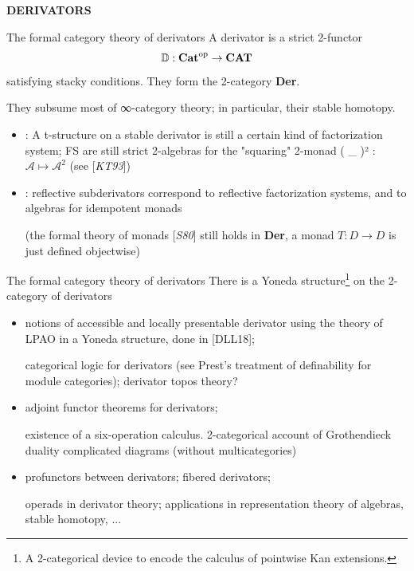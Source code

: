 \documentclass{beamer}
\def\lnk#1{\href{#1}{\faFilePdfO}}
\begin{document}
%
%
%
%
%
%
%
\begin{frame}
  \Huge\centering \bfseries DERIVATORS
\end{frame}
%
\begin{frame}{The formal category theory of derivators}
  A \alert{derivator} is a strict 2-functor
  \[\mathbb{D} : {\bf Cat}^\text{op} \to {\bf CAT} \]
  satisfying stacky conditions. They form the 2-category \textbf{Der}.

  They subsume most of ∞-category theory; in particular, their stable homotopy.
  \begin{itemize}
    \item<2-> [{[\alert{LV17}\lnk{https://www.sciencedirect.com/science/article/abs/pii/S0021869320300296}]}] : A t-structure on a stable derivator is still a certain kind of factorization system; FS are still \alert{strict 2-algebras} for the "squaring" 2-monad ( \_ )² : $\mathcal A \mapsto \mathcal A^2$ (see [\emph{KT93}])

    \item<3->  [{[\alert{Lor18}\lnk{https://arxiv.org/abs/1802.08193}]}] : reflective subderivators correspond to reflective factorization systems, and to algebras for idempotent monads

    (the \alert{formal theory of monads} [\emph{S80}] still holds in \textbf{Der}, a monad $T : D \to D$ is just defined objectwise)
  \end{itemize}
\end{frame}
%
\begin{frame}{The formal category theory of derivators}
  There is a \alert{Yoneda structure}\footnote{A 2-categorical device to encode the calculus of pointwise Kan extensions.} on the 2-category of derivators
\begin{itemize}
\item<2-> notions of \alert{accessible} and \alert{locally presentable} derivator using the theory of LPAO in a Yoneda structure, done in [\alert{DLL18}\lnk{https://arxiv.org/abs/1804.08710}]; 

{\footnotesize\color{gray!60} categorical logic for derivators (see Prest's treatment of \alert{definability} for module categories); derivator \alert{topos theory}?}
\item<3-> \alert{adjoint functor theorem}s for derivators; 

{\footnotesize\color{gray!60} existence of a six-operation calculus. 2-categorical account of Grothendieck duality complicated diagrams (without multicategories)}
\item<4-> \alert{profunctors} between derivators; fibered derivators; 

{\footnotesize\color{gray!60} \alert{operads} in derivator theory; applications in representation theory of algebras, stable homotopy, ...}
\end{itemize}
\end{frame}
\end{document}
